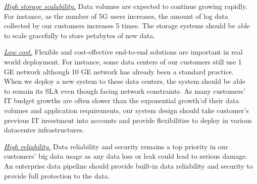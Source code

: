 

\noindent \underline{\textit{High storage scalability.}}  Data volumes are expected to continue growing rapidly. For instance, as the number of 5G users increases, the amount of log data collected by our customers increases 5 times. The storage systems should be able to scale gracefully to store petabytes of new data.



\noindent \underline{\textit{Low cost.}} Flexible and cost-effective end-to-end solutions are important in real world deployment. For instance, some data centers of our customers still use 1 GE network although 10 GE network has already been a standard practice. When we deploy a new system to these data centers, the system should be able to remain its SLA even though facing network constraints. As many customers' IT budget growths are often slower than the exponential growth'of their data volumes and application requirements, our system design should take customer's previous IT investment into accounts and provide flexibilities to deploy in various datacenter infrastructures.





\noindent \underline{\textit{High reliability.}} Data reliability and security remains a top priority in our customers' big data usage as any data loss or leak  could lead to serious damage. An enterprise data pipeline should provide built-in data reliability and security to provide full protection to the data.















